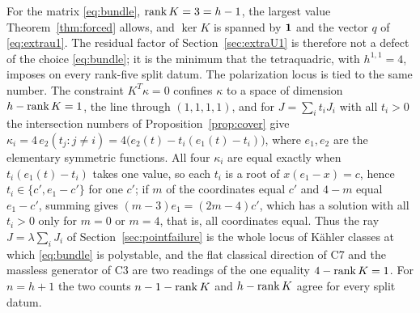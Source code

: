 \begin{remark}\label{rem:forcedfixed}
For the matrix \eqref{eq:bundle}, $\operatorname{rank} K=3=h-1$, the largest value
Theorem~\ref{thm:forced} allows, and $\ker K$ is spanned by $\mathbf{1}$ and the
vector $q$ of \eqref{eq:extrau1}. The residual factor of
Section~\ref{sec:extraU1} is therefore not a defect of the choice
\eqref{eq:bundle}; it is the minimum that the tetraquadric, with
$h^{1,1}=4$, imposes on every rank-five split datum. The polarization
locus is tied to the same number. The constraint $K^{T}\kappa=0$ confines
$\kappa$ to a space of dimension $h-\operatorname{rank} K=1$, the line through
$(1,1,1,1)$, and for $J=\sum_it_iJ_i$ with all $t_i>0$ the intersection
numbers of Proposition~\ref{prop:cover} give
$\kappa_i=4\,e_2(t_j:j\ne i)=4\bigl(e_2(t)-t_i(e_1(t)-t_i)\bigr)$, where
$e_1,e_2$ are the elementary symmetric functions. All four $\kappa_i$ are
equal exactly when $t_i(e_1(t)-t_i)$ takes one value, so each $t_i$ is a
root of $x(e_1-x)=c$, hence $t_i\in\{c',e_1-c'\}$ for one $c'$; if $m$ of
the coordinates equal $c'$ and $4-m$ equal $e_1-c'$, summing gives
$(m-3)e_1=(2m-4)c'$, which has a solution with all $t_i>0$ only for $m=0$
or $m=4$, that is, all coordinates equal. Thus the ray $J=\lambda\sum_iJ_i$
of Section~\ref{sec:pointfailure} is the whole locus of K\"ahler classes
at which \eqref{eq:bundle} is polystable, and the flat classical direction
of C7 and the massless generator of C3 are two readings of the one
equality $4-\operatorname{rank} K=1$. For $n=h+1$ the two counts $n-1-\operatorname{rank} K$ and
$h-\operatorname{rank} K$ agree for every split datum.
\end{remark}

